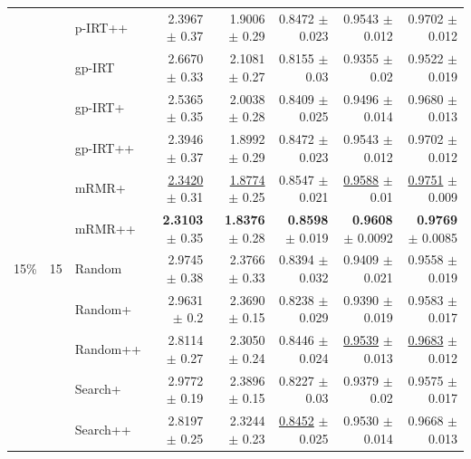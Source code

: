 \begin{longtable}{llp{}rrrrr}
 &  & p-IRT++ & 2.3967 {\scriptsize $\pm$ 0.37} & 1.9006 {\scriptsize $\pm$ 0.29} & 0.8472 {\scriptsize $\pm$ 0.023} & 0.9543 {\scriptsize $\pm$ 0.012} & 0.9702 {\scriptsize $\pm$ 0.012} \\
 &  & gp-IRT & 2.6670 {\scriptsize $\pm$ 0.33} & 2.1081 {\scriptsize $\pm$ 0.27} & 0.8155 {\scriptsize $\pm$ 0.03} & 0.9355 {\scriptsize $\pm$ 0.02} & 0.9522 {\scriptsize $\pm$ 0.019} \\
 &  & gp-IRT+ & 2.5365 {\scriptsize $\pm$ 0.35} & 2.0038 {\scriptsize $\pm$ 0.28} & 0.8409 {\scriptsize $\pm$ 0.025} & 0.9496 {\scriptsize $\pm$ 0.014} & 0.9680 {\scriptsize $\pm$ 0.013} \\
 &  & gp-IRT++ & 2.3946 {\scriptsize $\pm$ 0.37} & 1.8992 {\scriptsize $\pm$ 0.29} & 0.8472 {\scriptsize $\pm$ 0.023} & 0.9543 {\scriptsize $\pm$ 0.012} & 0.9702 {\scriptsize $\pm$ 0.012} \\
 &  & mRMR+ & \underline{2.3420} {\scriptsize $\pm$ 0.31} & \underline{1.8774} {\scriptsize $\pm$ 0.25} & 0.8547 {\scriptsize $\pm$ 0.021} & \underline{0.9588} {\scriptsize $\pm$ 0.01} & \underline{0.9751} {\scriptsize $\pm$ 0.009} \\
 &  & mRMR++ & \textbf{2.3103} {\scriptsize $\pm$ 0.35} & \textbf{1.8376} {\scriptsize $\pm$ 0.28} & \textbf{0.8598} {\scriptsize $\pm$ 0.019} & \textbf{0.9608} {\scriptsize $\pm$ 0.0092} & \textbf{0.9769} {\scriptsize $\pm$ 0.0085} \\
\midrule
15\% & 15 & Random & 2.9745 {\scriptsize $\pm$ 0.38} & 2.3766 {\scriptsize $\pm$ 0.33} & 0.8394 {\scriptsize $\pm$ 0.032} & 0.9409 {\scriptsize $\pm$ 0.021} & 0.9558 {\scriptsize $\pm$ 0.019} \\
 &  & Random+ & 2.9631 {\scriptsize $\pm$ 0.2} & 2.3690 {\scriptsize $\pm$ 0.15} & 0.8238 {\scriptsize $\pm$ 0.029} & 0.9390 {\scriptsize $\pm$ 0.019} & 0.9583 {\scriptsize $\pm$ 0.017} \\
 &  & Random++ & 2.8114 {\scriptsize $\pm$ 0.27} & 2.3050 {\scriptsize $\pm$ 0.24} & 0.8446 {\scriptsize $\pm$ 0.024} & \underline{0.9539} {\scriptsize $\pm$ 0.013} & \underline{0.9683} {\scriptsize $\pm$ 0.012} \\
 &  & Search+ & 2.9772 {\scriptsize $\pm$ 0.19} & 2.3896 {\scriptsize $\pm$ 0.15} & 0.8227 {\scriptsize $\pm$ 0.03} & 0.9379 {\scriptsize $\pm$ 0.02} & 0.9575 {\scriptsize $\pm$ 0.017} \\
 &  & Search++ & 2.8197 {\scriptsize $\pm$ 0.25} & 2.3244 {\scriptsize $\pm$ 0.23} & \underline{0.8452} {\scriptsize $\pm$ 0.025} & 0.9530 {\scriptsize $\pm$ 0.014} & 0.9668 {\scriptsize $\pm$ 0.013} \\

\end{longtable}
